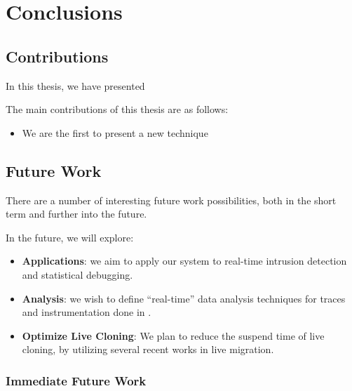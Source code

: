 \chapter{Conclusions}
\label{ch:conclusions}

\section{Contributions}
\label{sec:contributions}

In this thesis, we have presented 

The main contributions of this thesis are as follows:

\begin{itemize}
	\item We are the first to present a new technique 
\end{itemize}

\section{Future Work}
\label{sec:future}

There are a number of interesting future work possibilities, both in the short term and further into the future.

In the future, we will explore: 
\begin{itemize}
	\item \textbf{Applications}: we aim to apply our system to real-time intrusion detection and statistical debugging.
	\item \textbf{Analysis}: we wish to define ``real-time'' data analysis techniques for traces and instrumentation done in \parikshan.
	\item \textbf{Optimize Live Cloning}: We plan to reduce the suspend time of live cloning, by utilizing several recent works in live migration.
\end{itemize}


\subsection{Immediate Future Work}
\label{sec:immediate}

